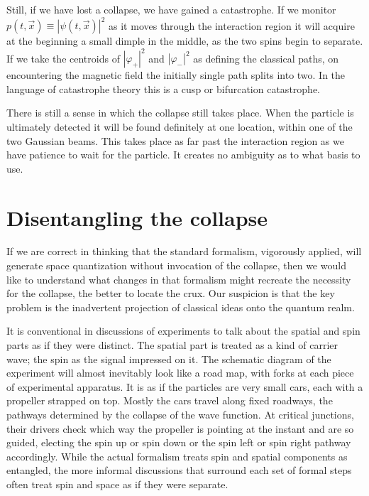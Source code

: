 \documentclass[aps,prl,superscriptaddress,12pt]{revtex4-2}
\begin{document}
Still, if we have lost a collapse, 
we have gained a catastrophe.
If we monitor  
$p\left( {t,\vec x} \right)\equiv \left| {\psi \left( {t,\vec x} \right)} \right|^2$
as it moves through the interaction region it will acquire at the beginning a small dimple in the middle, as the two spins begin to separate.
If we take the centroids of  
$\left| {\varphi _+} \right|^2$
and  
$\left| {\varphi _-} \right|^2$
as defining the classical paths, on encountering the magnetic field the initially single path splits into two.
In the language of catastrophe theory\cite{Arnold:1986} this is a cusp or bifurcation catastrophe.

There is still a sense in which the collapse still takes place.
When the particle is ultimately detected it will be found definitely at one location, within one of the two Gaussian beams.
This takes place as far past the interaction region as we have patience to wait for the particle.
It creates no ambiguity as to what basis to use.


\section{Disentangling the collapse}

If we are correct in thinking that the standard formalism, vigorously applied, 
	will generate space quantization without invocation of the collapse, 
	then we would like to understand what changes in that formalism 
	might recreate the necessity for the collapse, the better to locate the crux.
Our suspicion is that the key problem is the inadvertent projection of classical ideas onto the quantum realm.

It is conventional in discussions of \sg experiments to talk about the spatial and spin parts as if they were distinct.
The spatial part is treated as a kind of carrier wave; the spin as the signal impressed on it.
The schematic diagram of the \sg experiment will almost inevitably look like a road map, with forks at each piece of experimental apparatus.
It is as if the particles are very small cars, each with a propeller strapped on top.
Mostly the cars travel along fixed roadways, the pathways determined by the collapse of the wave function.
At critical junctions, their drivers check which way the propeller is pointing at the instant and are so guided, electing the spin up or spin down or the spin left or spin right pathway accordingly.
While the actual formalism treats spin and spatial components as entangled, the more informal discussions that surround each set of formal steps often treat spin and space as if they were separate.
\end{document}
